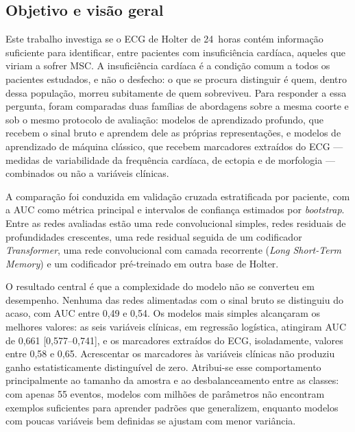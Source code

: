 
\subsection{Objetivo e visão geral}
\label{sec:intro-objetivo}

Este trabalho investiga se o \gls{ECG} de Holter de 24~horas contém
informação suficiente para identificar, entre pacientes com insuficiência
cardíaca, aqueles que viriam a sofrer \gls{MSC}. A insuficiência cardíaca é
a condição comum a todos os pacientes estudados, e não o desfecho: o que se
procura distinguir é quem, dentro dessa população, morreu subitamente de
quem sobreviveu. Para responder a essa
pergunta, foram comparadas duas famílias de abordagens sobre a mesma coorte
e sob o mesmo protocolo de avaliação: modelos de aprendizado profundo, que
recebem o sinal bruto e aprendem dele as próprias representações, e modelos
de aprendizado de máquina clássico, que recebem marcadores extraídos do
\gls{ECG} --- medidas de variabilidade da frequência cardíaca, de ectopia e
de morfologia --- combinados ou não a variáveis clínicas.

A comparação foi conduzida em validação cruzada estratificada por paciente,
com a \gls{AUC} como métrica principal e intervalos de confiança estimados
por \textit{bootstrap}. Entre as redes avaliadas estão uma rede convolucional
simples, redes residuais de profundidades crescentes, uma rede residual
seguida de um codificador \textit{Transformer}, uma rede convolucional com
camada recorrente (\textit{Long Short-Term Memory}) e um codificador
pré-treinado em outra base de Holter.

O resultado central é que a complexidade do modelo não se converteu em
desempenho. Nenhuma das redes alimentadas com o sinal bruto se distinguiu do
acaso, com \gls{AUC} entre 0,49 e 0,54. Os modelos mais simples alcançaram os
melhores valores: as seis variáveis clínicas, em regressão logística,
atingiram \gls{AUC} de 0,661 [0,577--0,741], e os marcadores extraídos do
\gls{ECG}, isoladamente, valores entre 0,58 e 0,65. Acrescentar os
marcadores às variáveis clínicas não produziu ganho estatisticamente
distinguível de zero. Atribui-se esse comportamento principalmente ao
tamanho da amostra e ao desbalanceamento entre as classes: com apenas 55
eventos, modelos com milhões de parâmetros não encontram exemplos
suficientes para aprender padrões que generalizem, enquanto modelos com
poucas variáveis bem definidas se ajustam com menor variância.

